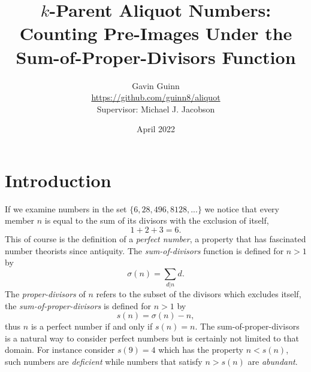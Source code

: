\documentclass{article}
\title{$k$-Parent Aliquot Numbers: Counting Pre-Images Under the Sum-of-Proper-Divisors Function}
\author{Gavin Guinn\\\url{https://github.com/guinn8/aliquot}\\{ Supervisor: Michael J. Jacobson}}
\date{April 2022}
\theoremstyle{definition}
\begin{document}
\maketitle

\section{Introduction}
If we examine numbers in the set $\{6, 28, 496, 8128, ...\}$ we notice that every member $n$ is equal to the sum of its divisors  with the exclusion of itself,
$$1+2+3 = 6.$$
This of course is the definition of a \textit{perfect number}, a property that has fascinated number theorists since antiquity. The \textit{sum-of-divisors} function is defined for $n > 1$ by
$$\sigma(n) = \sum_{d|n} d.$$
The \textit{proper-divisors} of $n$ refers to the subset of the divisors which excludes itself, the \textit{sum-of-proper-divisors} is defined for $n > 1$ by
$$s(n) = \sigma(n) - n,$$
thus $n$ is a perfect number if and only if $s(n) = n$. The sum-of-proper-divisors is a natural way to consider perfect numbers but is certainly not limited to that domain. For instance consider $s(9) = 4$ which has the property $n < s(n)$, such numbers are \textit{deficient} while numbers that satisfy $n > s(n)$ are \textit{abundant}.
\end{document}
